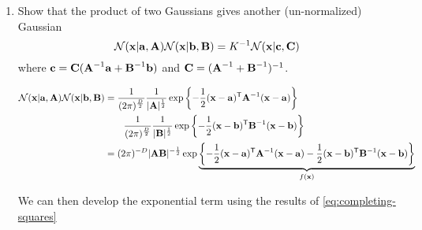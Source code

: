 \documentclass{amsmlaj}
\begin{document}
\begin{problem}

\begin{enumerate}
\item Show that the product of two Gaussians gives another
				(un-normalized) Gaussian
				$$
				\mathcal{N}(\bm{\mathbf{x}}|\bm{\mathbf{a}},\bm{\mathbf{A}})\mathcal{N}(\bm{\mathbf{x}}|\bm{\mathbf{b}},\bm{\mathbf{B}})
				= K^{-1}\mathcal{N}(\bm{\mathbf{x}}|\bm{\mathbf{c}},\bm{\mathbf{C}})
				$$
				where $\bm{\mathbf{c}}=\bm{\mathbf{C}}(\bm{\mathbf{A}}^{-1}\bm{\mathbf{a}} +
				\bm{\mathbf{B}}^{-1}\bm{\mathbf{b}})$ and
				$\bm{\mathbf{C}}=(\bm{\mathbf{A}}^{-1}+\bm{\mathbf{B}}^{-1})^{-1}$.

	\begin{equation} \label{eq:gaussian-product}
		\begin{split}
			\mathcal{N}(\bm{\mathbf{x}}|\bm{\mathbf{a}},\bm{\mathbf{A}})\mathcal{N}(\bm{\mathbf{x}}|\bm{\mathbf{b}},\bm{\mathbf{B}})&=
			\frac{1}{(2\pi)^{\frac{D}{2}}}\frac{1}{|\bm{\mathbf{A}}|^{\frac{1}{2}}}\exp\left\{
				-\frac{1}{2}(\bm{\mathbf{x}}-\bm{\mathbf{a}})^{\mathsf{T}}\bm{\mathbf{A}}^{-1}(\bm{\mathbf{x}}-\bm{\mathbf{a}})
			\right\} \\
			&\qquad\frac{1}{(2\pi)^{\frac{D}{2}}}\frac{1}{|\bm{\mathbf{B}}|^{\frac{1}{2}}}\exp\left\{
				-\frac{1}{2}(\bm{\mathbf{x}}-\bm{\mathbf{b}})^{\mathsf{T}}\bm{\mathbf{B}}^{-1}(\bm{\mathbf{x}}-\bm{\mathbf{b}})
			\right\} \\
			&=(2\pi)^{-D}|\bm{\mathbf{AB}}|^{-\frac{1}{2}}\exp\underbrace{\left\{
							-\frac{1}{2}(\bm{\mathbf{x}}-\bm{\mathbf{a}})^{\mathsf{T}}\bm{\mathbf{A}}^{-1}(\bm{\mathbf{x}}-\bm{\mathbf{a}})
							-\frac{1}{2}(\bm{\mathbf{x}}-\bm{\mathbf{b}})^{\mathsf{T}}\bm{\mathbf{B}}^{-1}(\bm{\mathbf{x}}-\bm{\mathbf{b}})
			\right\}}_{f(\bm{\mathbf{x}})}
		\end{split}
	\end{equation}

	We can then develop the exponential term using the results of
	\eqref{eq:completing-squares}


\end{enumerate}
\end{problem}
\end{document}
